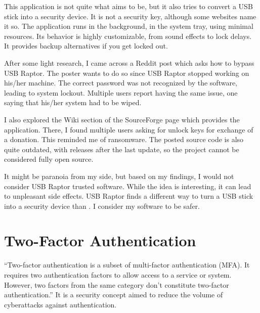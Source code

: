 This application is not quite what \app{} aims to be, but it also tries to convert a USB stick into a security device.
It is not a security key, although some websites name it so.
The application runs in the background, in the system tray, using minimal resources.
Its behavior is highly customizable, from sound effects to lock delays.
It provides backup alternatives if you get locked out.

After some light research, I came across a Reddit post which asks how to bypass USB Raptor\cite{usb-raptor-issues}.
The poster wants to do so since USB Raptor stopped working on his/her machine.
The correct password was not recognized by the software, leading to system lockout.
Multiple users report having the same issue, one saying that his/her system had to be wiped.

I also explored the Wiki section of the SourceForge page which provides the application.
There, I found multiple users asking for unlock keys for exchange of a donation.
This reminded me of ransomware.
The posted source code is also quite outdated, with releases after the last update, so the project cannot be considered fully open source.

It might be paranoia from my side, but based on my findings, I would not consider USB Raptor trusted software.
While the idea is interesting, it can lead to unpleasant side effects.
USB Raptor finds a different way to turn a USB stick into a security device than \app{}.
I consider my software to be safer.



\section{Two-Factor Authentication} \label{lab:ch3-two-factor-authentication}

``Two-factor authentication is a subset of multi-factor authentication (MFA).
It requires two authentication factors to allow access to a service or system.
However, two factors from the same category don't constitute two-factor authentication.''\cite{2faexplanation}
It is a security concept aimed to reduce the volume of cyberattacks against authentication.

